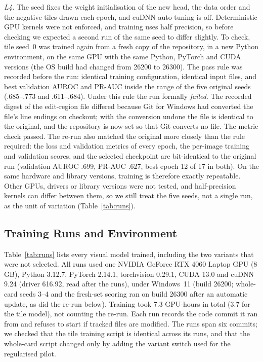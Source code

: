 \documentclass[12pt]{article}
\begin{document}
\emph{L4.} The seed fixes the weight initialisation of the new head,
the data order and the negative tiles drawn each epoch, and cuDNN
auto-tuning is off. Deterministic GPU kernels were not enforced, and
training uses half precision, so before checking we expected a second
run of the same seed to differ slightly. To check, tile seed~0 was
trained again from a fresh copy of the repository, in a new Python
environment, on the same GPU with the same Python, PyTorch and CUDA
versions (the OS build had changed from 26200 to 26300). The pass rule
was recorded before the run: identical training configuration,
identical input files, and best validation AUROC and PR-AUC inside the
range of the five original seeds (.685--.773 and .611--.684). Under
this rule the run formally \emph{failed}. The recorded digest of the
edit-region file differed because Git for Windows had converted the
file's line endings on checkout; with the conversion undone the file is
identical to the original, and the repository is now set so that Git
converts no file. The metric check passed. The re-run also matched the
original more closely than the rule required: the loss and validation
metrics of every epoch, the per-image training and validation scores,
and the selected checkpoint are bit-identical to the original run
(validation AUROC .699, PR-AUC .627, best epoch 12 of 17 in both). On
the same hardware and library versions, training is therefore exactly
repeatable. Other GPUs, drivers or library versions were not tested,
and half-precision kernels can differ between them, so we still treat
the five seeds, not a single run, as the unit of variation
(Table~\ref{tab:runs}).

\subsection*{Training Runs and Environment}

Table~\ref{tab:runs} lists every visual model trained, including the
two variants that were not selected. All runs used one NVIDIA GeForce
RTX 4060 Laptop GPU (8\,GB), Python 3.12.7, PyTorch 2.14.1,
torchvision 0.29.1, CUDA 13.0 and cuDNN 9.24 (driver 616.92, read
after the runs), under Windows~11 (build
26200; whole-card seeds 3--4 and the fresh-set scoring ran on build
26300 after an automatic update, as did the re-run below). Training
took 7.3 GPU-hours in total (3.7 for the tile model), not counting the
re-run. Each run records the code commit it ran from
and refuses to start if tracked files are modified. The runs span six
commits; we checked that the tile training script is identical across
its runs, and that the whole-card script changed only by adding the
variant switch used for the regularised pilot.
\end{document}
